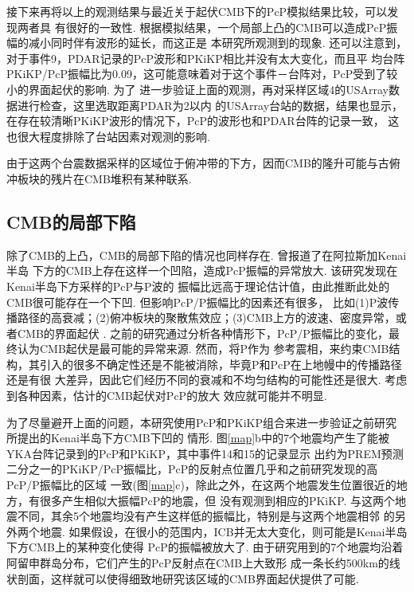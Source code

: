 接下来再将以上的观测结果与最近关于起伏CMB下的PcP模拟结果比较\citep{Wu2014a}，可以发现两者具
有很好的一致性. 根据模拟结果，一个局部上凸的CMB可以造成PcP振幅的减小同时伴有波形的延长，而这正是
本研究所观测到的现象. 还可以注意到，对于事件9，PDAR记录的PcP波形和PKiKP相比并没有太大变化，而且平
均台阵PKiKP/PcP振幅比为0.09，这可能意味着对于这个事件－台阵对，PcP受到了较小的界面起伏的影响. 为了
进一步验证上面的观测，再对采样区域4的USArray数据进行检查，这里选取距离PDAR为2{\textdegree}以内
的USArray台站的数据，结果也显示，在存在较清晰PKiKP波形的情况下，PcP的波形也和PDAR台阵的记录一致，
这也很大程度排除了台站因素对观测的影响. 

由于这两个台震数据采样的区域位于俯冲带的下方，因而CMB的隆升可能与古俯冲板块的残片在CMB堆积有某种联系. 

\subsection{CMB的局部下陷}

除了CMB的上凸，CMB的局部下陷的情况也同样存在. \citet{Rost2004a}曾报道了在阿拉斯加Kenai半岛
下方的CMB上存在这样一个凹陷，造成PcP振幅的异常放大. 该研究发现在Kenai半岛下方采样的PcP与P波的
振幅比远高于理论估计值，由此推断此处的CMB很可能存在一个下凹. 但影响PcP/P振幅比的因素还有很多，
比如(1)P波传播路径的高衰减；(2)俯冲板块的聚散焦效应；(3)CMB上方的波速、密度异常，或者CMB的界面起伏
. 之前的研究通过分析各种情形下，PcP/P振幅比的变化，最终认为CMB起伏是最可能的异常来源. 然而，将P作为
参考震相，来约束CMB结构，其引入的很多不确定性还是不能被消除，毕竟P和PcP在上地幔中的传播路径还是有很
大差异，因此它们经历不同的衰减和不均匀结构的可能性还是很大. 考虑到各种因素，估计的CMB起伏对PcP的放大
效应就可能并不明显. 

为了尽量避开上面的问题，本研究使用PcP和PKiKP组合来进一步验证之前研究所提出的Kenai半岛下方CMB下凹的
情形. 图\ref{map}b中的7个地震均产生了能被YKA台阵记录到的PcP和PKiKP，其中事件14和15的记录显示
出约为PREM预测二分之一的PKiKP/PcP振幅比，PcP的反射点位置几乎和之前研究发现的高PcP/P振幅比的区域
一致(图\ref{map}c)，除此之外，在这两个地震发生位置很近的地方，有很多产生相似大振幅PcP的地震，但
没有观测到相应的PKiKP. 与这两个地震不同，其余5个地震均没有产生这样低的振幅比，特别是与这两个地震相邻
的另外两个地震. 如果假设，在很小的范围内，ICB并无太大变化，则可能是Kenai半岛下方CMB上的某种变化使得
PcP的振幅被放大了. 由于研究用到的7个地震均沿着阿留申群岛分布，它们产生的PcP反射点在CMB上大致形
成一条长约500km的线状剖面，这样就可以使得细致地研究该区域的CMB界面起伏提供了可能. 

